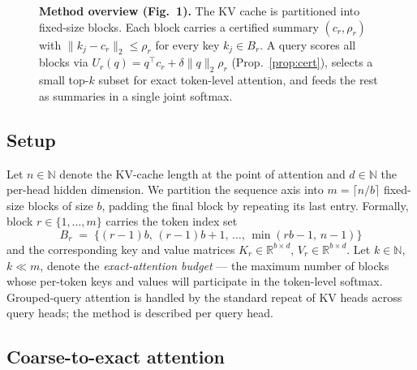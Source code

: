 \documentclass[11pt]{article}
\theoremstyle{plain}
\theoremstyle{definition}
\newcommand{\R}{\mathbb{R}}
\newcommand{\N}{\mathbb{N}}
\newcommand{\ur}{U_r}
\newcommand{\normq}{\lVert q \rVert_2}
\begin{document}
\begin{figure}[t]
\caption{\textbf{Method overview (Fig.~1).} The KV cache is partitioned
into fixed-size blocks. Each block carries a certified summary
$(c_r, \rho_r)$ with $\|k_j - c_r\|_2 \le \rho_r$ for every key
$k_j \in B_r$. A query scores all blocks via
$\ur(q) = q^\top c_r + \delta \normq \rho_r$ (Prop.~\ref{prop:cert}),
selects a small top-$k$ subset for exact token-level attention, and feeds
the rest as summaries in a single joint softmax.}
\label{fig:method}
\end{figure}

\subsection{Setup}

Let $n \in \N$ denote the KV-cache length at the point of attention and
$d \in \N$ the per-head hidden dimension. We partition the sequence axis
into $m = \lceil n / b \rceil$ fixed-size blocks of size $b$, padding the
final block by repeating its last entry. Formally, block $r \in \{1, \dots, m\}$
carries the token index set
\[
B_r \;=\; \bigl\{(r-1)b,\, (r-1)b + 1,\, \dots,\, \min(rb - 1,\, n - 1)\bigr\}
\]
and the corresponding key and value matrices $K_r \in \R^{b \times d}$,
$V_r \in \R^{b \times d}$. Let $k \in \N$, $k \ll m$, denote the
\emph{exact-attention budget} --- the maximum number of blocks whose
per-token keys and values will participate in the token-level softmax.
Grouped-query attention is handled by the standard repeat of KV heads
across query heads; the method is described per query head.

\subsection{Coarse-to-exact attention}
\label{sec:coarse-exact}
\end{document}

